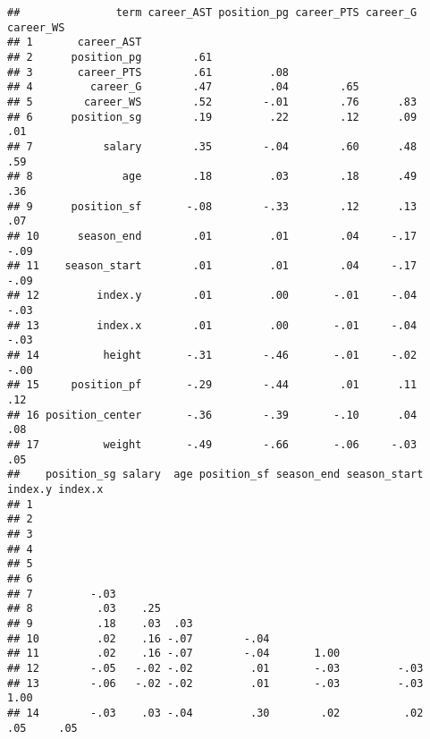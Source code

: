\documentclass[
]{book}
\begin{document}
\begin{verbatim}
##               term career_AST position_pg career_PTS career_G career_WS
## 1       career_AST                                                     
## 2      position_pg        .61                                          
## 3       career_PTS        .61         .08                              
## 4         career_G        .47         .04        .65                   
## 5        career_WS        .52        -.01        .76      .83          
## 6      position_sg        .19         .22        .12      .09       .01
## 7           salary        .35        -.04        .60      .48       .59
## 8              age        .18         .03        .18      .49       .36
## 9      position_sf       -.08        -.33        .12      .13       .07
## 10      season_end        .01         .01        .04     -.17      -.09
## 11    season_start        .01         .01        .04     -.17      -.09
## 12         index.y        .01         .00       -.01     -.04      -.03
## 13         index.x        .01         .00       -.01     -.04      -.03
## 14          height       -.31        -.46       -.01     -.02      -.00
## 15     position_pf       -.29        -.44        .01      .11       .12
## 16 position_center       -.36        -.39       -.10      .04       .08
## 17          weight       -.49        -.66       -.06     -.03       .05
##    position_sg salary  age position_sf season_end season_start index.y index.x
## 1                                                                             
## 2                                                                             
## 3                                                                             
## 4                                                                             
## 5                                                                             
## 6                                                                             
## 7         -.03                                                                
## 8          .03    .25                                                         
## 9          .18    .03  .03                                                    
## 10         .02    .16 -.07        -.04                                        
## 11         .02    .16 -.07        -.04       1.00                             
## 12        -.05   -.02 -.02         .01       -.03         -.03                
## 13        -.06   -.02 -.02         .01       -.03         -.03    1.00        
## 14        -.03    .03 -.04         .30        .02          .02     .05     .05

\end{verbatim}
\end{document}
